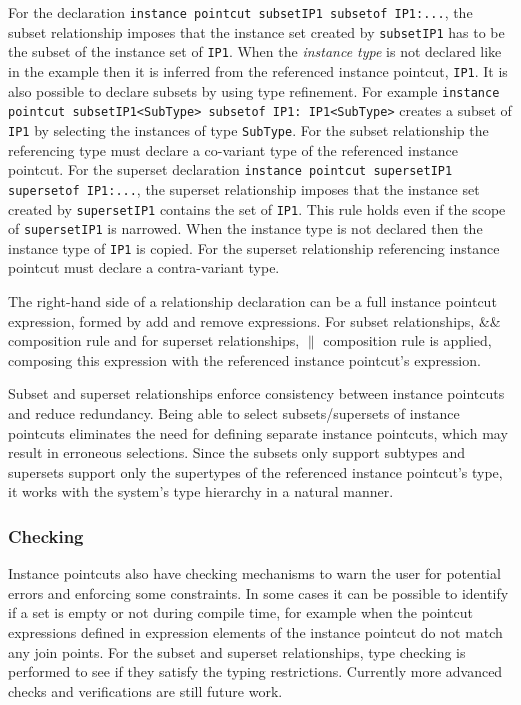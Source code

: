 \documentclass{acm_proc_article-sp}
\begin{document}
For the declaration \lstinline!instance pointcut subsetIP1 subsetof IP1:...!, the subset relationship imposes that the instance set created by \texttt{subsetIP1} has to be the subset of the instance set of \texttt{IP1}. When the \emph{instance type} is not declared like in the example then it is inferred from the referenced instance pointcut, \texttt{IP1}. It is also possible to declare subsets by using type refinement. For example
\lstinline!instance pointcut subsetIP1<SubType> subsetof IP1: IP1<SubType>!
creates a subset of \texttt{IP1} by selecting the instances of type \texttt{SubType}. For the subset relationship the referencing type must declare a co-variant type of the referenced instance pointcut.
For the superset declaration \lstinline!instance pointcut supersetIP1 supersetof IP1:...!, the superset relationship imposes that the instance set created by \texttt{supersetIP1} contains the set of \texttt{IP1}. This rule holds even if the scope of \texttt{supersetIP1} is narrowed. When the instance type is not declared then the instance type of \texttt{IP1} is copied. For the superset relationship referencing instance pointcut must declare a contra-variant type.

The right-hand side of a relationship declaration can be a full instance pointcut expression, formed by add and remove expressions. For subset relationships, \&\& composition rule and for superset relationships, $\|$ composition rule is applied, composing this expression with the referenced instance pointcut's expression.

Subset and superset relationships enforce consistency between instance pointcuts and reduce redundancy. Being able to select subsets/supersets of instance pointcuts eliminates the need for defining separate instance pointcuts, which may result in erroneous selections. Since the subsets only support subtypes and supersets support only the supertypes of the referenced instance pointcut's type, it works with the system's type hierarchy in a natural manner. 

\subsubsection{Checking}
Instance pointcuts also have checking mechanisms to warn the user for potential errors and enforcing some constraints. In some cases it can be possible to identify if a set is empty or not during compile time, for example when the pointcut expressions defined in expression elements of the instance pointcut do not match any join points. For the subset and superset relationships, type checking is performed to see if they satisfy the typing restrictions. Currently more advanced checks and verifications are still future work.
\end{document}
